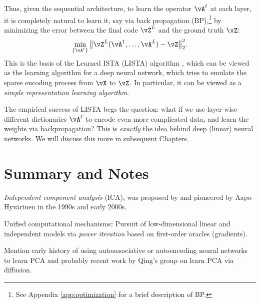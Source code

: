 \documentclass[../../book-main.tex]{subfiles}
\begin{document}
Thus, given the sequential architecture, to learn the operator \(\vA^\ell\) at each layer, it is completely natural to learn it, say via back propagation (BP),\footnote{See Appendix \ref{app:optimization} for a brief description of BP.} by minimizing the error between the final code $\vZ^L$ and the ground truth $\vZ$:
\begin{equation}
    \min_{\{\vA^\ell\}} \big\|\vZ^L(\vA^1, \ldots, \vA^{L}) - \vZ\big\|_2^2.
\end{equation}
This is the basis of the Learned ISTA (LISTA) algorithm \cite{gregor2010learning}, which can be viewed as the learning algorithm for a deep  neural network, which tries to emulate the sparse encoding process from $\vX$ to $\vZ$. In particular, it can be viewed as a \textit{simple representation learning algorithm}. 


The empirical success of LISTA begs the question: what if we use layer-wise different  dictionaries \(\vA^\ell\) to encode even more complicated data, and learn the weights via backpropagation? This is \textit{exactly} the idea behind deep (linear) neural networks. We will discuss this more in subsequent Chapters.






\section{Summary and Notes}



\textit{Independent component analysis} (ICA), was proposed by \cite{Ans-1985} and pioneered by Aapo Hyv\"{a}rinen in the 1990s and early 2000s.

Unified computational mechanisms: Pursuit of low-dimensional linear and independent models via {\em power iteration} based on first-order oracles (gradients). 

Mention early history of using autoassociative or autoencoding neural networks to learn PCA and probably recent work by Qing's group on learn PCA via diffusion. 
\end{document}
